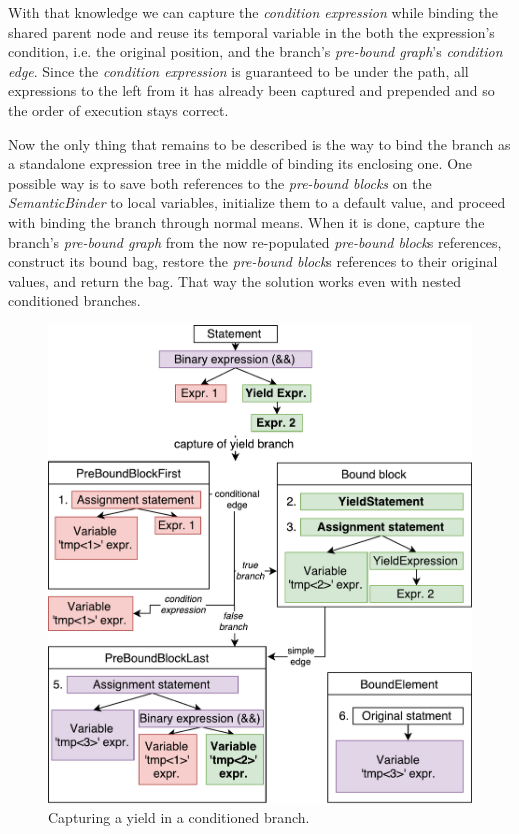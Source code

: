 With that knowledge we can capture the \emph{condition expression} while binding the shared parent node and reuse its temporal variable in the both the expression’s condition, i.e. the original position, and the branch’s \emph{pre-bound graph}’s \emph{condition edge}. Since the \emph{condition expression} is guaranteed to be under the path, all expressions to the left from it has already been captured and prepended and so the order of execution stays correct.

Now the only thing that remains to be described is the way to bind the branch as a standalone expression tree in the middle of binding its enclosing one. One possible way is to save both references to the \emph{pre-bound blocks} on the \emph{SemanticBinder} to local variables, initialize them to a default value, and proceed with binding the branch through normal means. When it is done, capture the branch’s \emph{pre-bound graph} from the now re-populated \emph{pre-bound block}s references, construct its bound bag, restore the \emph{pre-bound block}s references to their original values, and return the bag. That way the solution works even with nested conditioned branches.

\begin{figure}[H]
	\centering	
	\includegraphics[scale=0.75]{../img/5_3_yieldInCond}	
	\caption{Capturing a yield in a conditioned branch.}
	\label{fig5.3:YieldInCond}
\end{figure}

